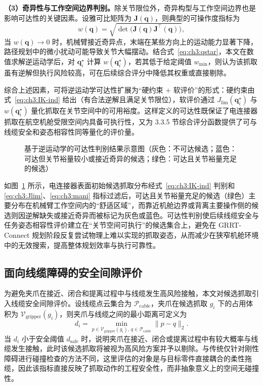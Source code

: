 \textbf{（3）奇异性与工作空间边界判别。}除关节限位外，奇异构型与工作空间边界也是影响可达性的关键因素。设雅可比矩阵为 $\mathbf{J}(\mathbf{q})$，则典型的可操作度指标为
\begin{equation}
  w(\mathbf{q})=\sqrt{\det\bigl(\mathbf{J}(\mathbf{q})\mathbf{J}^\top(\mathbf{q})\bigr)},
  \label{eq:ch3:mani}
\end{equation}
当 $w(\mathbf{q})\rightarrow 0$ 时，机械臂接近奇异点，末端在某些方向上的运动能力显著下降，路径规划中的微小扰动可能导致关节大幅摆动。结合式~\eqref{eq:ch3:qstar}，本文在数值求解逆运动学后，对 $\mathbf{q}_i^\star$ 计算 $w(\mathbf{q}_i^\star)$，若其低于给定阈值 $w_{\min}$，则认为该抓取虽有逆解但执行风险较高，可在后续综合评分中降低其权重或直接剔除。

综合上述因素，可将逆运动学可达性扩展为“硬约束 + 软评价”的形式：硬约束由式~\eqref{eq:ch3:IK-ind} 给出（有合法逆解且满足关节限位），软评价通过 $J_{\mathrm{lim}}(\mathbf{q}_i^\star)$ 与 $w(\mathbf{q}_i^\star)$ 量化抓取在关节空间中的可用裕度。这样定义的可达性既保证了电连接器抓取在航空机舱受限空间内具备可执行性，又为 3.3.5 节综合评分函数提供了可与线缆安全和姿态相容性同等量化的评价量。

\begin{figure}[htbp]
  \centering
  \caption{基于逆运动学的可达性判别结果示意图（灰色：不可达候选；蓝色：可达但关节裕量较小或接近奇异的候选；绿色：可达且关节裕量充足的候选）}
  \label{fig:ch3:grasp-dist2}
\end{figure}

如图~\ref{fig:ch3:grasp-dist2} 所示，电连接器表面初始候选抓取分布经式~\eqref{eq:ch3:IK-ind} 判别和 \eqref{eq:ch3:Jlim}、\eqref{eq:ch3:mani} 指标过滤后，可达且关节裕量充足的候选（绿色）主要分布在机械臂工作空间内的“舒适区域”，而靠近机舱边界或背离主要操作侧的候选则因逆解缺失或接近奇异而被标记为灰色或蓝色。可达性判别使后续线缆安全与任务姿态相容性评价建立在“关节空间可执行”的候选集合上，避免在 GRRT-Connect 规划阶段反复尝试物理上难以实现的抓取姿态，从而减少在狭窄机舱环境中的无效搜索，提高整体规划效率与执行可靠性。

\subsection{面向线缆障碍的安全间隙评价}

为避免夹爪在接近、闭合和提离过程中与线缆发生高风险接触，本文对候选抓取引入线缆安全间隙评价。设线缆点云集合为 $\mathcal{P}_{\mathrm{cable}}$，夹爪在候选抓取 $g_i$ 下的占用体积为 $\mathcal{V}_{\mathrm{gripper}}(g_i)$，则夹爪与线缆之间的最小距离可定义为
\begin{equation}
  d_i=\min_{p\in\mathcal{V}_{\mathrm{gripper}}(g_i),\,q\in\mathcal{P}_{\mathrm{cable}}}\|p-q\|_2.
\end{equation}
当 $d_i$ 小于安全阈值 $d_{\mathrm{safe}}$ 时，说明夹爪在接近、闭合或提离过程中有较大概率与线缆发生接触，此时该候选抓取将被视为高风险方案并予以剔除。与传统仅针对刚性障碍进行碰撞检查的方法不同，这里评估的对象是与目标零件直接耦合的柔性拖缆，因此该指标直接反映了抓取动作的工程安全性，而非抽象意义上的空间无碰撞性。

